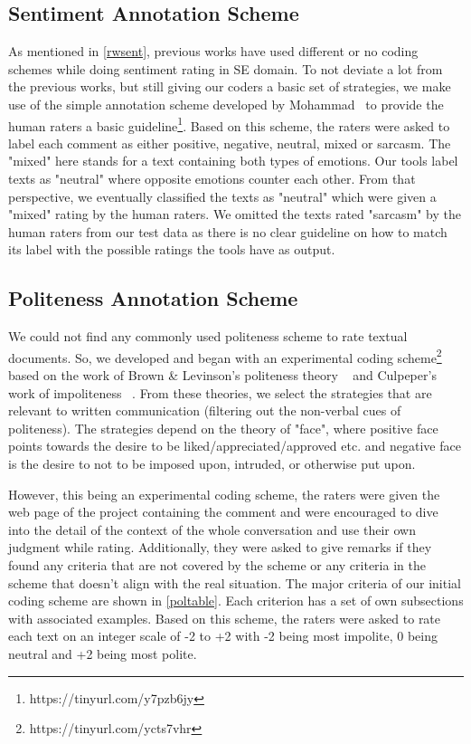 \subsection{Sentiment Annotation Scheme}\label{sentscheme}


As mentioned in \ref{rwsent}, previous works have used different or no coding schemes while doing sentiment rating in SE domain. To not deviate a lot from the previous works, but still giving our coders a basic set of strategies, we make use of the simple annotation scheme developed by Mohammad~\cite{mohammad2016practical} to provide the human raters a basic guideline\footnote{https://tinyurl.com/y7pzb6jy}. Based on this scheme, the raters were asked to label each comment as either positive, negative, neutral, mixed or sarcasm. The "mixed" here stands for a text containing both types of emotions. Our tools label texts as "neutral" where opposite emotions counter each other. From that perspective, we eventually classified the texts as "neutral" which were given a "mixed" rating by the human raters. We omitted the texts rated "sarcasm" by the human raters from our test data as there is no clear guideline on how to match its label with the possible ratings the tools have as output. 

\subsection{Politeness Annotation Scheme}\label{polscheme}

We could not find any commonly used politeness scheme to rate textual documents. So, we developed and began with an experimental coding scheme\footnote{https://tinyurl.com/ycts7vhr} based on the work of Brown \& Levinson's politeness theory ~\cite{brown1987politeness} and Culpeper's work of impoliteness ~\cite{culpeper1996towards}. From these theories, we select the strategies that are relevant to written communication (filtering out the non-verbal cues of politeness). The strategies depend on the theory of "face", where positive face points towards the desire to be liked/appreciated/approved etc. and negative face is the desire to not to be imposed upon, intruded, or otherwise put upon.

However, this being an experimental coding scheme, the raters were given the web page of the project containing the comment and were encouraged to dive into the detail of the context of the whole conversation and use their own judgment while rating. Additionally, they were asked to give remarks if they found any criteria that are not covered by the scheme or any criteria in the scheme that doesn't align with the real situation. The major criteria of our initial coding scheme are shown in \ref{poltable}. Each criterion has a set of own subsections with associated examples. Based on this scheme, the raters were asked to rate each text on an integer scale of -2 to +2 with -2 being most impolite, 0 being neutral and +2 being most polite.  

